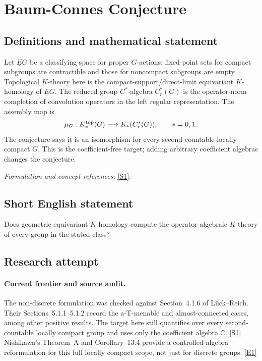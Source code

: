 \documentclass[11pt]{article}
\newcommand{\C}{\mathbb{C}}
\newcommand{\sref}[2]{\hyperlink{source:#1:#2}{[S#2]}}
\newcommand{\eref}[2]{\hyperlink{extra:#1:#2}{[E#2]}}
\newif\ifshowcatalogue
\newcommand{\cataloguescope}[1]{\ifshowcatalogue
 \paragraph{Exact scope in the supplied catalogue.}
 \begin{quote}\small #1\end{quote}\fi}
\begin{document}
\setcounter{section}{0}
\clearpage
\section*{\texorpdfstring{Baum-Connes Conjecture}{Baum-Connes Conjecture}}\label{statement}
\subsection{Definitions and mathematical statement}
Let $\underline EG$ be a classifying space for proper $G$-actions: fixed-point sets for compact subgroups are contractible and those for noncompact subgroups are empty. Topological $K$-theory here is the compact-support/direct-limit equivariant $K$-homology of $\underline EG$. The reduced group $C^*$-algebra $C_r^*(G)$ is the operator-norm completion of convolution operators in the left regular representation. The assembly map is
\[
 \mu_G:K_*^{\rm top}(G)\longrightarrow K_*(C_r^*(G)),\qquad *=0,1.
\]
The conjecture says it is an isomorphism for every second-countable locally compact $G$. This is the coefficient-free target; adding arbitrary coefficient algebras changes the conjecture.
\par\smallskip\textit{Formulation and concept references:} \sref{statement}{1}.
\cataloguescope{Prove the Baum-Connes conjecture for every second-countable locally compact group G: the assembly map K\_top(G) \ensuremath{\to} K(C*\_r(G)) from the topological K-theory of the group, built from the classifying space for proper actions, to the K-theory of the reduced group C*-algebra is an isomorphism.}
\subsection{Short English statement}
Does geometric equivariant $K$-homology compute the operator-algebraic $K$-theory of every group in the stated class?
\subsection{Research attempt}

\paragraph{Current frontier and source audit.}
The non-discrete formulation was checked against Section~4.1.6 of
L\"uck--Reich. Their Sections~5.1.1--5.1.2 record the a-T-menable and
almost-connected cases, among other positive results. The target here
still quantifies over every second-countable locally compact group and
uses only the coefficient algebra $\C$. \sref{statement}{1}
Nishikawa's Theorem~A and Corollary~13.4 provide a controlled-algebra
reformulation for this full locally compact scope, not just for discrete
groups. \eref{statement}{1}
\end{document}
